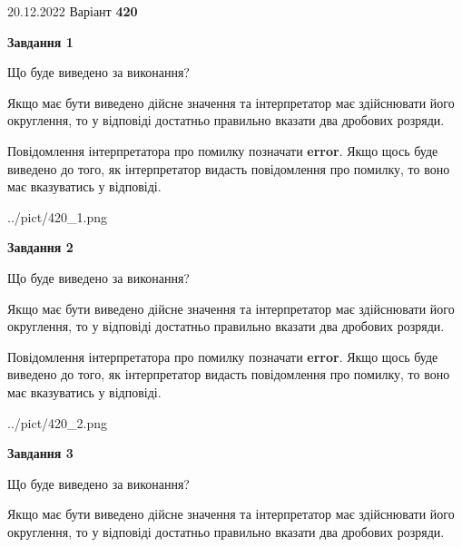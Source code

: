 \documentclass[12pt, ukrainian]{article}
\begin{document}
{20.12.2022 Варіант \No \textbf { 420 }\par}
{
\begin {Large}

{\begin {center}\textbf{Завдання 1}\end {center}}\par
Що буде виведено за виконання? \par

Якщо має бути виведено дійсне значення та інтерпретатор має здійснювати його округлення, 
то у відповіді достатньо правильно вказати два дробових розряди.

Повідомлення інтерпретатора про помилку позначати \textbf{error}.
Якщо щось буде виведено до того, як інтерпретатор видасть повідомлення про помилку, 
то воно має вказуватись у відповіді. \par

\begin{center}
	{../pict/420_1.png}
\end{center}
\newpage

{\begin {center}\textbf{Завдання 2}\end {center}}\par
Що буде виведено за виконання? \par

Якщо має бути виведено дійсне значення та інтерпретатор має здійснювати його округлення, 
то у відповіді достатньо правильно вказати два дробових розряди.

Повідомлення інтерпретатора про помилку позначати \textbf{error}.
Якщо щось буде виведено до того, як інтерпретатор видасть повідомлення про помилку, 
то воно має вказуватись у відповіді. \par

\begin{center}
	{../pict/420_2.png}
\end{center}
\newpage

{\begin {center}\textbf{Завдання 3}\end {center}}\par
Що буде виведено за виконання? \par

Якщо має бути виведено дійсне значення та інтерпретатор має здійснювати його округлення, 
то у відповіді достатньо правильно вказати два дробових розряди.


\end{Large}}
\end{document}
